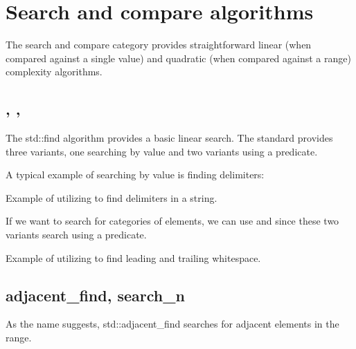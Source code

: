 \section{Search and compare algorithms}

The search and compare category provides straightforward linear (when compared against a single value) and quadratic (when compared against a range) complexity algorithms.

\subsection{\texorpdfstring{, , }{\texttt{std::find}, \texttt{std::find\_if}, \texttt{std::find\_if\_not}}}

The std::find algorithm provides a basic linear search. The standard provides three variants, one searching by value and two variants using a predicate.



A typical example of searching by value is finding delimiters:

\begin{box-note}
\footnotesize Example of utilizing  to find delimiters in a string.
\tcblower
{}
\end{box-note}

If we want to search for categories of elements, we can use  and  since these two variants search using a predicate.

\begin{box-note}
\footnotesize Example of utilizing  to find leading and trailing whitespace.
\tcblower
{}
\end{box-note}

\subsection{adjacent\_find, search\_n}

As the name suggests, std::adjacent\_find searches for adjacent elements in the range.

